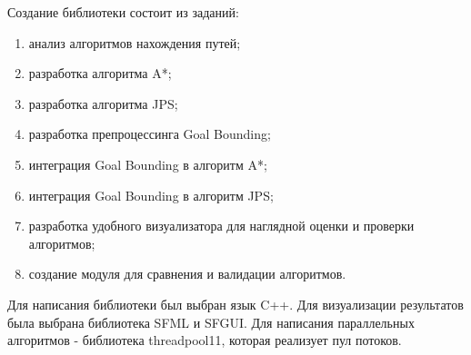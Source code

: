 Создание библиотеки состоит из заданий:

\begin{enumerate}
    \item анализ алгоритмов нахождения путей;
    \item разработка алгоритма A*;
    \item разработка алгоритма JPS;
    \item разработка препроцессинга Goal Bounding;
    \item интеграция Goal Bounding в алгоритм A*;
    \item интеграция Goal Bounding в алгоритм JPS;
    \item разработка удобного визуализатора для наглядной оценки и проверки алгоритмов;
    \item создание модуля для сравнения и валидации алгоритмов.
\end{enumerate}

Для написания библиотеки был выбран язык C++. Для визуализации результатов была выбрана библиотека SFML и SFGUI. Для написания параллельных алгоритмов - библиотека threadpool11, которая реализует пул потоков.